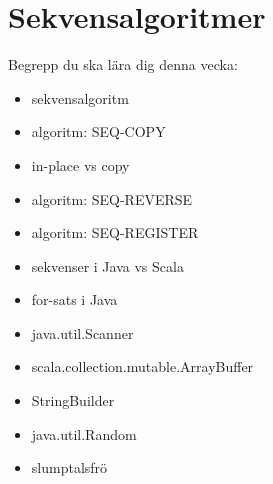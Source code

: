 \chapter{Sekvensalgoritmer}\label{chapter:W05}
Begrepp du ska lära dig denna vecka:
\begin{itemize}[noitemsep,label={$\square$},leftmargin=*]
\item sekvensalgoritm
\item algoritm: SEQ-COPY
\item in-place vs copy
\item algoritm: SEQ-REVERSE
\item algoritm: SEQ-REGISTER
\item sekvenser i Java vs Scala
\item for-sats i Java
\item java.util.Scanner
\item scala.collection.mutable.ArrayBuffer
\item StringBuilder
\item java.util.Random
\item slumptalsfrö\end{itemize}
